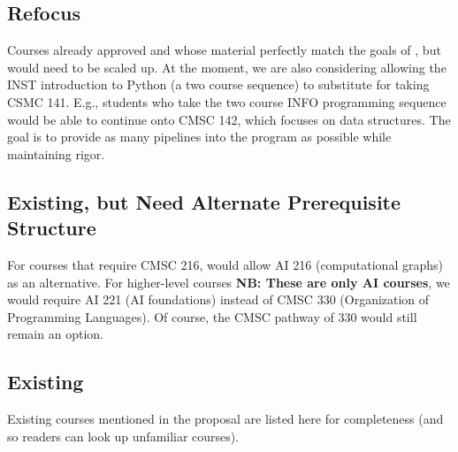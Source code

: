 \documentclass[
10pt, %
a4paper, %
oneside, %
headinclude,footinclude, %
BCOR5mm, %
]{scrartcl}
\begin{document}
    



  \subsection{Refocus}

    Courses already approved and whose material perfectly match the goals of \short{}, but would need to be scaled up.  At the moment, we are also considering allowing the INST introduction to Python (a two course sequence) to substitute for taking CSMC 141.  E.g., students who take the two course INFO programming sequence would be able to continue onto CMSC 142, which focuses on data structures.  The goal is to provide as many pipelines into the program as possible while maintaining rigor.
    
  


    \subsection{Existing, but Need Alternate Prerequisite Structure}

    For courses that require CMSC 216, would allow AI 216 (computational graphs) as an alternative.  For higher-level courses \textbf{NB: These are only AI courses}, we would require AI 221 (AI foundations) instead of CMSC 330 (Organization of Programming Languages).  Of course, the CMSC pathway of 330 would still remain an option.

    

  \subsection{Existing}

    Existing courses mentioned in the proposal are listed here for completeness (and so readers can look up unfamiliar courses).  

  
  
  



%
\end{document}
